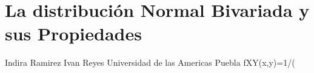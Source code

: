 \documentclass[11pt]{article}
\begin{document}
         

\section{La distribución Normal Bivariada y sus Propiedades}
\label{Portada}
Indira Ramirez
Ivan Reyes
Universidad de las Americas Puebla
fXY(x,y)=1/(
\end{document}
